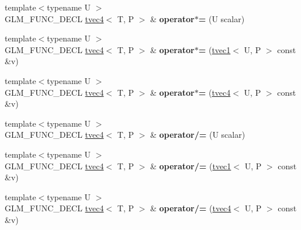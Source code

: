\begin{DoxyCompactItemize}
\item 
\hypertarget{structglm_1_1tvec4_a47a71969dd36394620eb95af9ad63554}{{\footnotesize template$<$typename U $>$ }\\G\-L\-M\-\_\-\-F\-U\-N\-C\-\_\-\-D\-E\-C\-L \hyperlink{structglm_1_1tvec4}{tvec4}$<$ T, P $>$ \& {\bfseries operator$\ast$=} (U scalar)}\label{structglm_1_1tvec4_a47a71969dd36394620eb95af9ad63554}

\item 
\hypertarget{structglm_1_1tvec4_a88ce896b3a895723b122b7499263c29f}{{\footnotesize template$<$typename U $>$ }\\G\-L\-M\-\_\-\-F\-U\-N\-C\-\_\-\-D\-E\-C\-L \hyperlink{structglm_1_1tvec4}{tvec4}$<$ T, P $>$ \& {\bfseries operator$\ast$=} (\hyperlink{structglm_1_1tvec1}{tvec1}$<$ U, P $>$ const \&v)}\label{structglm_1_1tvec4_a88ce896b3a895723b122b7499263c29f}

\item 
\hypertarget{structglm_1_1tvec4_af42a89aec5ba8557af8f45829d4d52e0}{{\footnotesize template$<$typename U $>$ }\\G\-L\-M\-\_\-\-F\-U\-N\-C\-\_\-\-D\-E\-C\-L \hyperlink{structglm_1_1tvec4}{tvec4}$<$ T, P $>$ \& {\bfseries operator$\ast$=} (\hyperlink{structglm_1_1tvec4}{tvec4}$<$ U, P $>$ const \&v)}\label{structglm_1_1tvec4_af42a89aec5ba8557af8f45829d4d52e0}

\item 
\hypertarget{structglm_1_1tvec4_a9db36befe0fef144842aa4b1097a953c}{{\footnotesize template$<$typename U $>$ }\\G\-L\-M\-\_\-\-F\-U\-N\-C\-\_\-\-D\-E\-C\-L \hyperlink{structglm_1_1tvec4}{tvec4}$<$ T, P $>$ \& {\bfseries operator/=} (U scalar)}\label{structglm_1_1tvec4_a9db36befe0fef144842aa4b1097a953c}

\item 
\hypertarget{structglm_1_1tvec4_a617a3db69dfecb4f10bf7199eaf8e071}{{\footnotesize template$<$typename U $>$ }\\G\-L\-M\-\_\-\-F\-U\-N\-C\-\_\-\-D\-E\-C\-L \hyperlink{structglm_1_1tvec4}{tvec4}$<$ T, P $>$ \& {\bfseries operator/=} (\hyperlink{structglm_1_1tvec1}{tvec1}$<$ U, P $>$ const \&v)}\label{structglm_1_1tvec4_a617a3db69dfecb4f10bf7199eaf8e071}

\item 
\hypertarget{structglm_1_1tvec4_ad00994666628d9c12846b274ba3a16a1}{{\footnotesize template$<$typename U $>$ }\\G\-L\-M\-\_\-\-F\-U\-N\-C\-\_\-\-D\-E\-C\-L \hyperlink{structglm_1_1tvec4}{tvec4}$<$ T, P $>$ \& {\bfseries operator/=} (\hyperlink{structglm_1_1tvec4}{tvec4}$<$ U, P $>$ const \&v)}\label{structglm_1_1tvec4_ad00994666628d9c12846b274ba3a16a1}


\end{DoxyCompactItemize}
